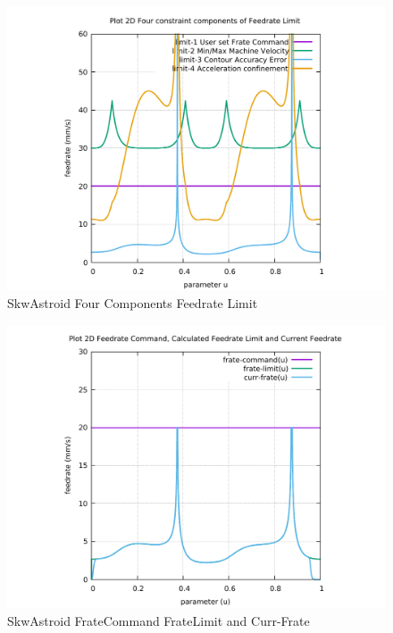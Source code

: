 \begin{figure}
	\caption     {SkwAstroid Four Components Feedrate Limit}
	\label{10-img-SkwAstroid-Four-Components-Feedrate-Limit.pdf}
	\includegraphics[width=1.00\textwidth]{Chap4/appendix/app-SkwAstroid/plots/10-img-SkwAstroid-Four-Components-Feedrate-Limit.pdf}
\end{figure}

\clearpage
\pagebreak

\begin{figure}
	\caption     {SkwAstroid FrateCommand FrateLimit and Curr-Frate}
	\label{11-img-SkwAstroid-FrateCommand-FrateLimit-and-Curr-Frate.pdf}
	\includegraphics[width=1.00\textwidth]{Chap4/appendix/app-SkwAstroid/plots/11-img-SkwAstroid-FrateCommand-FrateLimit-and-Curr-Frate.pdf}
\end{figure}


